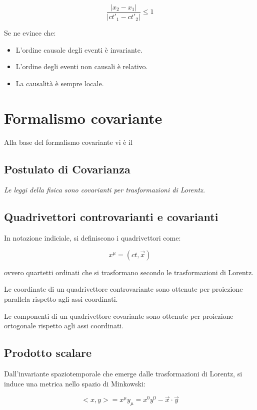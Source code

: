 \documentclass{article}
\begin{document}
\begin{equation}
    \frac{|x_2-x_1|}{|ct'_1-ct'_2|} \leq 1
\end{equation}

Se ne evince che:

\begin{itemize}
    \item L'ordine causale degli eventi è invariante.
    \item L'ordine degli eventi non causali è relativo.
    \item La causalità è sempre locale.
\end{itemize}

\section{Formalismo covariante}
Alla base del formalismo covariante vi è il

\subsection*{Postulato di Covarianza}
\textit{
    Le leggi della fisica sono covarianti per trasformazioni di Lorentz.
}
\subsection{Quadrivettori controvarianti e covarianti}
In notazione indiciale, si definiscono i quadrivettori come:

\begin{equation}
    x^\mu = (ct, \vec{x})
\end{equation}

ovvero quartetti ordinati che si trasformano secondo le trasformazioni di Lorentz.

Le coordinate di un quadrivettore controvariante sono ottenute per proiezione parallela rispetto agli assi coordinati.

Le componenti di un quadrivettore covariante sono ottenute per proiezione ortogonale rispetto agli assi coordinati.

\subsection{Prodotto scalare}
Dall'invariante spaziotemporale che emerge dalle trasformazioni di Lorentz, si induce una metrica nello spazio di Minkowski:

\begin{equation}
    <x,y> = x^\mu y_\mu = x^0y^0 - \vec{x} \cdot \vec{y}
\end{equation}
\end{document}
